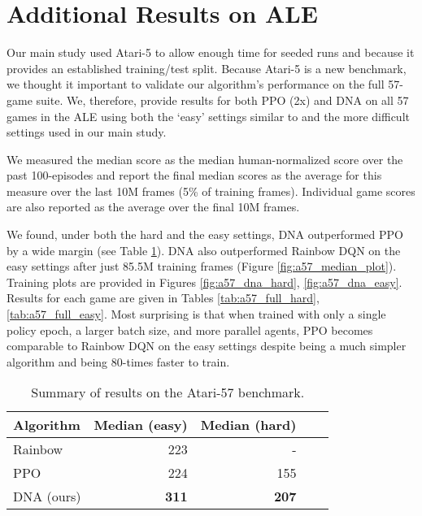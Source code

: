 \documentclass{article}
\begin{document}
\clearpage

\section{Additional Results on ALE}
\label{app:full}

Our main study used Atari-5 to allow enough time for seeded runs and because it provides an established training/test split. Because Atari-5 is a new benchmark, we thought it important to validate our algorithm's performance on the full 57-game suite. We, therefore, provide results for both PPO (2x) and DNA on all 57 games in the ALE using both the `easy' settings similar to \cite{hessel2018rainbow} and the more difficult settings used in our main study. 

We measured the median score as the median human-normalized score over the past 100-episodes and report the final median scores as the average for this measure over the last 10M frames (5\% of training frames). Individual game scores are also reported as the average over the final 10M frames.

We found, under both the hard and the easy settings, DNA outperformed PPO by a wide margin (see Table \ref{tab:a57_summary}). DNA also outperformed Rainbow DQN on the easy settings after just 85.5M training frames (Figure \ref{fig:a57_median_plot}). Training plots are provided in Figures \ref{fig:a57_dna_hard}, \ref{fig:a57_dna_easy}. Results for each game are given in Tables \ref{tab:a57_full_hard}, \ref{tab:a57_full_easy}. Most surprising is that when trained with only a single policy epoch, a larger batch size, and more parallel agents, PPO becomes comparable to Rainbow DQN on the easy settings despite being a much simpler algorithm and being 80-times faster to train.

\begin{table}[h]
    \centering
    \caption{Summary of results on the Atari-57 benchmark.}
    \begin{tabular}{l r r r r}
    \toprule
         Algorithm &  Median (easy) & Median (hard) \\
    \midrule
         Rainbow & 223 & - \\
         PPO & 224 & 155 \\
         DNA (ours) & \textbf{311} & \textbf{207}\\
    \bottomrule
    \end{tabular}
    \label{tab:a57_summary}
\end{table}
\end{document}
